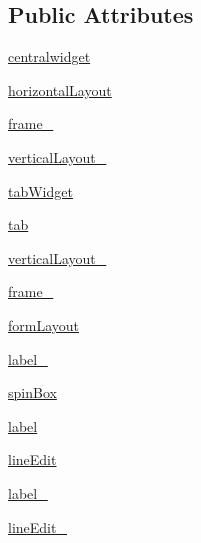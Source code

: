 \subsection*{Public Attributes}
\begin{DoxyCompactItemize}
\item 
\hyperlink{classpybootstrap_1_1pybootstrapUI_1_1Ui__MainWindow_a0536baec54820378b9fc8fb7d839e76d}{centralwidget}
\item 
\hyperlink{classpybootstrap_1_1pybootstrapUI_1_1Ui__MainWindow_a7d91d2893adf3f6bf1da9a85a3fe3ada}{horizontal\-Layout}
\item 
\hyperlink{classpybootstrap_1_1pybootstrapUI_1_1Ui__MainWindow_a0ada2edeb2b9dfaf7fc96c000351d8d4}{frame\-\_}
\item 
\hyperlink{classpybootstrap_1_1pybootstrapUI_1_1Ui__MainWindow_a4f2cf2786b06a8e4659f61730870f7f6}{vertical\-Layout\-\_}
\item 
\hyperlink{classpybootstrap_1_1pybootstrapUI_1_1Ui__MainWindow_a5d4d5b37c3deb66a1f91ed59561ea41f}{tab\-Widget}
\item 
\hyperlink{classpybootstrap_1_1pybootstrapUI_1_1Ui__MainWindow_ae26a444c1a9e77c2cb905c5fe7058505}{tab}
\item 
\hyperlink{classpybootstrap_1_1pybootstrapUI_1_1Ui__MainWindow_a5e50c1efe3f94bebf3a975341bc63250}{vertical\-Layout\-\_}
\item 
\hyperlink{classpybootstrap_1_1pybootstrapUI_1_1Ui__MainWindow_ac751aafa3eaf68b8fc699097f7d70263}{frame\-\_}
\item 
\hyperlink{classpybootstrap_1_1pybootstrapUI_1_1Ui__MainWindow_afcb087350cbee8410fa3380968d7291d}{form\-Layout}
\item 
\hyperlink{classpybootstrap_1_1pybootstrapUI_1_1Ui__MainWindow_a5285f2872e04297cc447751f04f7195d}{label\-\_}
\item 
\hyperlink{classpybootstrap_1_1pybootstrapUI_1_1Ui__MainWindow_a78f8bcf45ffa5dd9e37d051667efd8ca}{spin\-Box}
\item 
\hyperlink{classpybootstrap_1_1pybootstrapUI_1_1Ui__MainWindow_a349842530e9888b2b595eb264ccf87dc}{label}
\item 
\hyperlink{classpybootstrap_1_1pybootstrapUI_1_1Ui__MainWindow_a8a812e02ae9858202b94a71ea13deb64}{line\-Edit}
\item 
\hyperlink{classpybootstrap_1_1pybootstrapUI_1_1Ui__MainWindow_a15f513581744f939dfc11c02186c6795}{label\-\_}
\item 
\hyperlink{classpybootstrap_1_1pybootstrapUI_1_1Ui__MainWindow_a5c40b163c22c39727284c5c0a06478c3}{line\-Edit\-\_}

\end{DoxyCompactItemize}
